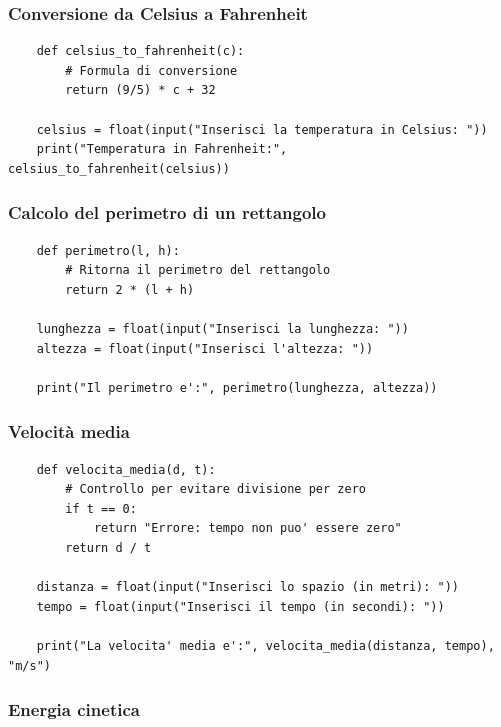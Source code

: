 \documentclass[a4paper,12pt]{article}
\begin{document}
\newpage

\subsubsection{Conversione da Celsius a Fahrenheit}

\begin{lstlisting}
	def celsius_to_fahrenheit(c):
		# Formula di conversione
		return (9/5) * c + 32
	
	celsius = float(input("Inserisci la temperatura in Celsius: "))
	print("Temperatura in Fahrenheit:", celsius_to_fahrenheit(celsius))
\end{lstlisting}

\newpage

\subsubsection{Calcolo del perimetro di un rettangolo}

\begin{lstlisting}
	def perimetro(l, h):
		# Ritorna il perimetro del rettangolo
		return 2 * (l + h)
	
	lunghezza = float(input("Inserisci la lunghezza: "))
	altezza = float(input("Inserisci l'altezza: "))
	
	print("Il perimetro e':", perimetro(lunghezza, altezza))
\end{lstlisting}

\newpage

\subsubsection{Velocità media}

\begin{lstlisting}
	def velocita_media(d, t):
		# Controllo per evitare divisione per zero
		if t == 0:
			return "Errore: tempo non puo' essere zero"
		return d / t
	
	distanza = float(input("Inserisci lo spazio (in metri): "))
	tempo = float(input("Inserisci il tempo (in secondi): "))
	
	print("La velocita' media e':", velocita_media(distanza, tempo), "m/s")
\end{lstlisting}

\newpage
\subsubsection{Energia cinetica}
\end{document}
